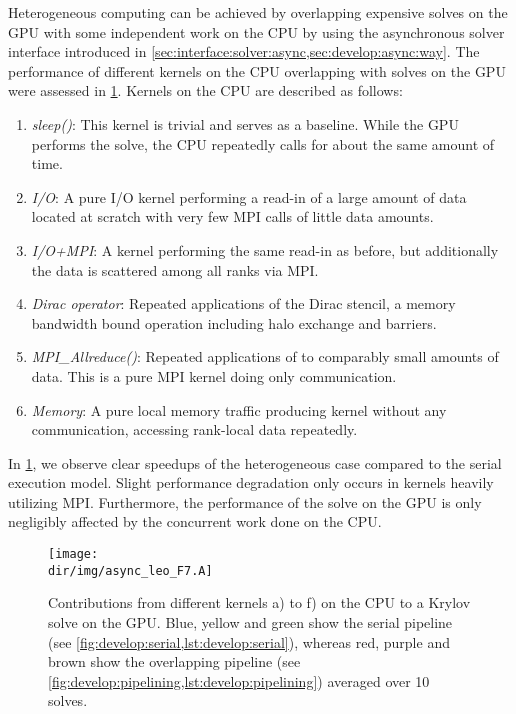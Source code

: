 Heterogeneous computing can be achieved by overlapping expensive solves on the GPU with some independent work on the CPU by using the asynchronous solver interface introduced in \cref{sec:interface:solver:async,sec:develop:async:way}.
The performance of different kernels on the CPU overlapping with solves on the GPU were assessed in \cref{fig:async:F7:leo:bar}.
Kernels on the CPU are described as follows:
\begin{enumerate}[label=\alph*)]
    \item \emph{sleep()}: This kernel is trivial and serves as a baseline. While the GPU performs the solve, the CPU repeatedly calls  for about the same amount of time.
    \item \emph{I/O}: A pure I/O kernel performing a read-in of a large amount of data located at scratch with very few MPI calls of little data amounts.
    \item \emph{I/O+MPI}: A kernel performing the same read-in as before, but additionally the data is scattered among all ranks via MPI.
    \item \emph{Dirac operator}: Repeated applications of the Dirac stencil, a memory bandwidth bound operation including halo exchange and barriers.
    \item \emph{MPI\_Allreduce()}: Repeated applications of  to comparably small amounts of data. This is a pure MPI kernel doing only communication.
    \item \emph{Memory}: A pure local memory traffic producing kernel without any communication, accessing rank-local data repeatedly.
\end{enumerate}

In \cref{fig:async:F7:leo:bar}, we observe clear speedups of the heterogeneous case compared to the serial execution model.
Slight performance degradation only occurs in kernels heavily utilizing MPI.
Furthermore, the performance of the solve on the GPU is only negligibly affected by the concurrent work done on the CPU.
\begin{figure}
    \centering
    \texttt{[image: \\dir/img/async\_leo\_F7.A]}
    \caption{Contributions from different kernels a) to f) on the CPU to a Krylov solve on the GPU. Blue, yellow and green show the serial pipeline (see \cref{fig:develop:serial,lst:develop:serial}), whereas red, purple and brown show the overlapping pipeline (see \cref{fig:develop:pipelining,lst:develop:pipelining}) averaged over \num{10} solves. }
    \label{fig:async:F7:leo:bar}
\end{figure}


